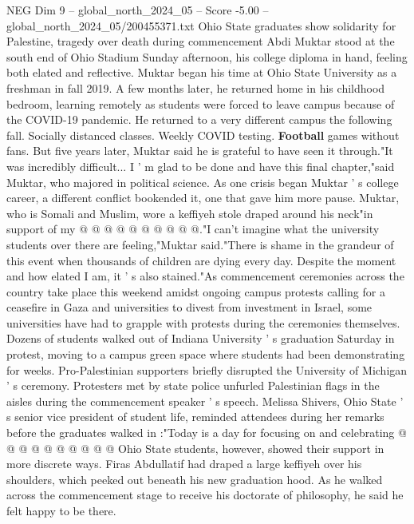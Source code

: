 \begin{textsample}{NEG Dim 9 – global\_north\_2024\_05 – Score -5.00 – global\_north\_2024\_05/200455371.txt}  \label{ex:f9_neg_240}
Ohio State graduates show solidarity for Palestine, tragedy over death during commencement Abdi Muktar stood at the south end of Ohio Stadium Sunday afternoon, his college diploma in hand, feeling both elated and reflective.
Muktar began his time at Ohio State University as a freshman in fall 2019.
A few months later, he returned home in his childhood bedroom, learning remotely as students were forced to leave campus because of the COVID-19 pandemic.
He returned to a very different campus the following fall.
Socially distanced classes.
Weekly COVID testing. \textbf{Football} games without fans.
But five years later, Muktar said he is grateful to have seen it through."It was incredibly difficult...
I ' m glad to be done and have this final chapter,"said Muktar, who majored in political science.
As one crisis began Muktar ' s college career, a different conflict bookended it, one that gave him more pause.
Muktar, who is Somali and Muslim, wore a keffiyeh stole draped around his neck"in support of my @ @ @ @ @ @ @ @ @ @."I can't imagine what the university students over there are feeling,"Muktar said."There is shame in the grandeur of this event when thousands of children are dying every day.
Despite the moment and how elated I am, it ' s also stained."As commencement ceremonies across the country take place this weekend amidst ongoing campus protests calling for a ceasefire in Gaza and universities to divest from investment in Israel, some universities have had to grapple with protests during the ceremonies themselves.
Dozens of students walked out of Indiana University ' s graduation Saturday in protest, moving to a campus green space where students had been demonstrating for weeks.
Pro-Palestinian supporters briefly disrupted the University of Michigan ' s ceremony.
Protesters met by state police unfurled Palestinian flags in the aisles during the commencement speaker ' s speech.
Melissa Shivers, Ohio State ' s senior vice president of student life, reminded attendees during her remarks before the graduates walked in :"Today is a day for focusing on and celebrating @ @ @ @ @ @ @ @ @ @ Ohio State students, however, showed their support in more discrete ways.
Firas Abdullatif had draped a large keffiyeh over his shoulders, which peeked out beneath his new graduation hood.
As he walked across the commencement stage to receive his doctorate of philosophy, he said he felt happy to be there.

\end{textsample}

